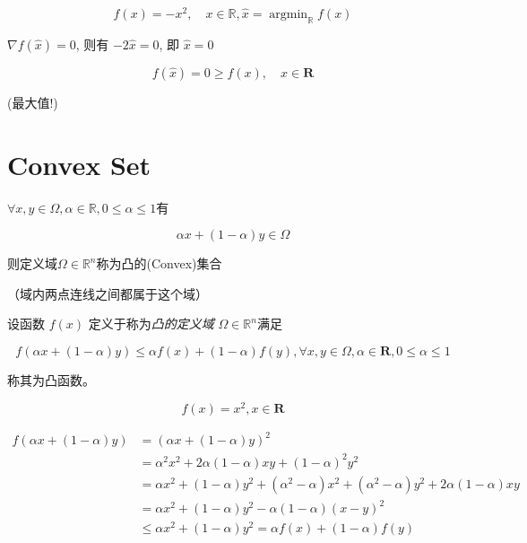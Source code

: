 \begin{example}
    $$ f(x)=-x^{2}, \quad x \in \mathbb{R}, \hat{x}=\operatorname{argmin}_{\mathbb{R}} f(x) $$

    $ \nabla f(\hat{x})=0 $, 则有 $ -2 \hat{x}=0 $, 即 $ \hat{x}=0 $

    $$ f(\hat{x})=0 \geq f(x), \quad x \in \mathbf{R} $$


    (最大值!)
\end{example}

\section{Convex Set}

\begin{definition}[凸集]
    $ \forall x, y \in \Omega, \alpha \in \mathbb{R}, 0 \leq \alpha \leq 1 $有

    $$ \alpha x+(1-\alpha) y \in \Omega $$

    则定义域$ \Omega \in \mathbb{R}^{n} $称为凸的(Convex)集合

    （域内两点连线之间都属于这个域）
\end{definition}

\begin{definition}[凸函数]
    设函数 $ f(x) $ 定义于称为\textit{凸的定义域} $ \Omega \in \mathbb{R}^{n} $满足

    $$ f(\alpha x+(1-\alpha) y) \leq \alpha f(x)+(1-\alpha) f(y), \forall x, y \in \Omega, \alpha \in \mathbf{R}, 0 \leq \alpha \leq 1 $$

    称其为凸函数。
\end{definition}


\begin{example}
    \label{Example:SquareIsConvex}
    $$ f(x)=x^{2}, x \in \mathbf{R} $$

    $$ \begin{aligned} f(\alpha x+(1-\alpha) y) &=(\alpha x+(1-\alpha) y)^{2} 
    \\ &=\alpha^{2} x^{2}+2 \alpha(1-\alpha) x y+(1-\alpha)^{2} y^{2} 
    \\ &=\alpha x^{2}+(1-\alpha) y^{2}+\left(\alpha^{2}-\alpha\right) x^{2}+\left(\alpha^{2}-\alpha\right) y^{2}+2 \alpha(1-\alpha) x y 
    \\ &=\alpha x^{2}+(1-\alpha) y^{2}-\alpha(1-\alpha)(x-y)^{2}
    \\ &\leq \alpha x^{2}+(1-\alpha) y^{2}=\alpha f(x)+(1-\alpha) f(y)
    \end{aligned} $$
\end{example}

